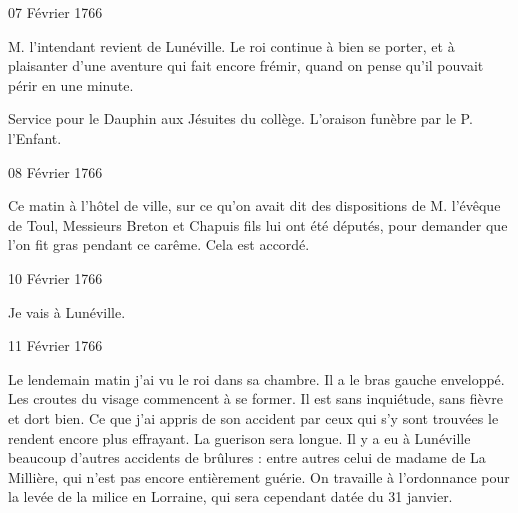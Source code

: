                      \begin{diary}{07 Février 1766}{}


                           M. l'intendant revient de
                              Lunéville. Le
                              roi continue à bien se porter, et à plaisanter
                           d'une aventure qui fait encore frémir, quand
                           on pense qu'il pouvait périr en une minute. \bigskip


                         Service pour le Dauphin aux Jésuites du collège. L'oraison funèbre par le P. l'Enfant. \bigskip


                     \end{diary}

                     \begin{diary}{08 Février 1766}{}

                         Ce matin à l'hôtel de ville, sur ce qu'on avait
                           dit des dispositions de M.
                              l'évêque de Toul, Messieurs
                           Breton et Chapuis fils lui ont été députés,
                           pour demander que l'on fit gras pendant
                           ce carême. Cela est accordé. \bigskip


                     \end{diary}

                     \begin{diary}{10 Février 1766}{}

                         Je vais à Lunéville. \bigskip


                     \end{diary}

                     \begin{diary}{11 Février 1766}{}

                         Le lendemain matin j'ai vu
                              le roi dans
                           sa chambre. Il a le bras gauche enveloppé.
                           Les croutes du visage commencent à se former.
                           Il est sans inquiétude, sans fièvre et dort bien. Ce que j'ai appris de son accident par ceux qui
                           s'y sont trouvées le rendent encore plus effrayant.
                           La guerison sera longue. Il y a eu à Lunéville
                           beaucoup d'autres accidents de brûlures :
                           entre autres celui de madame de La Millière, qui
                           n'est pas encore entièrement guérie.
                           On travaille à l'ordonnance pour la levée de
                           la milice en Lorraine, qui sera cependant
                           datée du 31 janvier. \bigskip


                     \end{diary}

